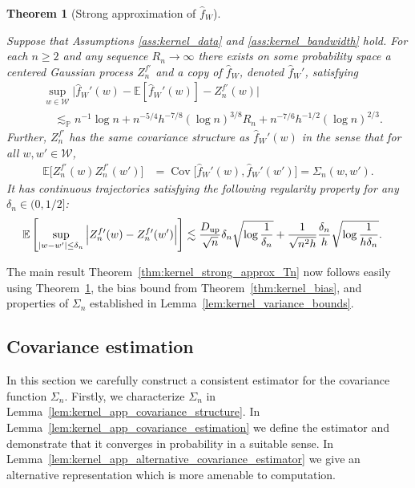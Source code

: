 \documentclass[11pt,lof]{puthesis}
\renewcommand{\P}{\ensuremath{\mathbb{P}}}
\newcommand{\E}{\ensuremath{\mathbb{E}}}
\newcommand{\cW}{\ensuremath{\mathcal{W}}}
\newcommand{\Du}{\ensuremath{D_{\textup{up}}}}
\DeclareMathOperator{\Cov}{Cov}
\theoremstyle{break}
\newtheorem{theorem}{Theorem}[section]
\theoremstyle{proof}
\begin{document}
\begin{theorem}[Strong approximation of $\hat f_W$]
  \label{thm:kernel_app_strong_approx_fW}

  Suppose that Assumptions \ref{ass:kernel_data} and \ref{ass:kernel_bandwidth}
  hold. For each $n \geq 2$ and any sequence $R_n \to \infty$ there exists on
  some probability space a centered Gaussian process $Z_n^{f\prime}$ and a copy
  of $\hat f_W$, denoted $\hat f_W'$, satisfying
  \begin{align*}
    &\sup_{w \in \cW}
    \Big|
    \hat f_W'(w) - \E[\hat f_W'(w)]
    - Z_n^{f\prime}(w)
    \Big| \\
    &\quad\lesssim_\P
    n^{-1} \log n
    + n^{-5/4} h^{-7/8} (\log n)^{3/8} R_n
    + n^{-7/6} h^{-1/2} (\log n)^{2/3}.
  \end{align*}
  Further, $Z_n^{f\prime}$ has the same covariance
  structure as
  $\hat f_W'(w)$
  in the sense that for all
  $w, w' \in \cW$,
  \begin{align*}
    \E\big[Z_n^{f\prime}(w) Z_n^{f\prime}(w')\big]
    &=
    \Cov\Big[
      \hat f_W'(w),
      \hat f_W'(w')
    \Big]
    = \Sigma_n(w,w').
  \end{align*}
  It has continuous trajectories satisfying the following regularity property
  for any $\delta_n \in (0, 1/2]$:
  \begin{align*}
    \E\left[
      \sup_{|w-w'| \leq \delta_n}
      \Big|
      Z_n^{f\prime}(w)
      - Z_n^{f\prime}(w')
      \Big|
    \right]
    &\lesssim
    \frac{\Du}{\sqrt n} \delta_n
    \sqrt{\log \frac{1}{\delta_n}}
    + \frac{1}{\sqrt{n^2h}}
    \frac{\delta_n}{h}
    \sqrt{\log \frac{1}{h\delta_n}}.
  \end{align*}
\end{theorem}

The main result Theorem~\ref{thm:kernel_strong_approx_Tn}
now follows easily using Theorem~\ref{thm:kernel_app_strong_approx_fW},
the bias bound from Theorem~\ref{thm:kernel_bias},
and properties of $\Sigma_n$ established in
Lemma~\ref{lem:kernel_variance_bounds}.

\subsection{Covariance estimation}
\label{sec:kernel_app_covariance_estimation}

In this section we carefully construct a consistent estimator for the
covariance function $\Sigma_n$. Firstly, we characterize $\Sigma_n$ in
Lemma~\ref{lem:kernel_app_covariance_structure}. In
Lemma~\ref{lem:kernel_app_covariance_estimation}
we define the estimator and demonstrate that it converges in probability in a
suitable sense. In Lemma~\ref{lem:kernel_app_alternative_covariance_estimator}
we give an
alternative representation which is more amenable to computation.
\end{document}
